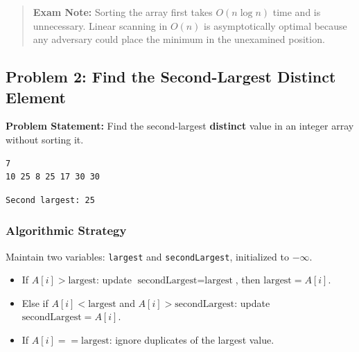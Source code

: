 \begin{quote}
\textbf{Exam Note:} Sorting the array first takes $O(n \log n)$ time and is unnecessary. Linear scanning in $O(n)$ is asymptotically optimal because any adversary could place the minimum in the unexamined position.
\end{quote}

\subsection{Problem 2: Find the Second-Largest Distinct Element}

\textbf{Problem Statement:} Find the second-largest \textbf{distinct} value in an integer array without sorting it.

\begin{lstlisting}[style=pseudocode, caption={Input}]
7
10 25 8 25 17 30 30
\end{lstlisting}

\begin{lstlisting}[style=pseudocode, caption={Expected Output}]
Second largest: 25
\end{lstlisting}

\subsubsection*{Algorithmic Strategy}
Maintain two variables: \texttt{largest} and \texttt{secondLargest}, initialized to $-\infty$.
\begin{itemize}
    \item If $A[i] > \text{largest}$: update $\text{secondLargest} = \text{largest}$, then $\text{largest} = A[i]$.
    \item Else if $A[i] < \text{largest}$ and $A[i] > \text{secondLargest}$: update $\text{secondLargest} = A[i]$.
    \item If $A[i] == \text{largest}$: ignore duplicates of the largest value.
\end{itemize}

